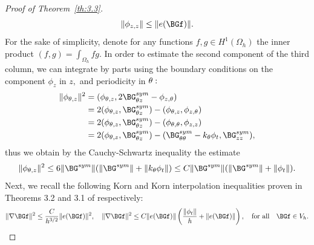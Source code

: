 \begin{proof}[Proof of Theorem~{\ref{th:3.3}}]
\begin{equation}
\label{4.14}
\|\phi_{z,z}\|\leq \|e(\BGf)\|.
\end{equation}%
For the sake of simplicity, denote for any functions $f,g\in H^1(\Omega_h)$ the inner product $(f,g)=\int_{\Omega_h}fg.$ In order to estimate the second component of the third column, we can integrate by parts using the boundary conditions on the component $\phi_z$ in $z,$ and periodicity in $\theta:$
\begin{align*}
\|\phi_{\Gth,z}\|^2&=(\phi_{\Gth,z},2\BG^{sym}_{\Gth z}-\phi_{z,\Gth})\\ 
&=2(\phi_{\Gth,z},\BG^{sym}_{\Gth z})-(\phi_{\Gth,z},\phi_{z,\Gth})\\
&=2(\phi_{\Gth,z},\BG^{sym}_{\Gth z})-(\phi_{\Gth,\Gth},\phi_{z,z})\\
&=2(\phi_{\Gth,z},\BG^{sym}_{\Gth z})-(\BG^{sym}_{\Gth\Gth}-k_\Gth \phi_{t},\BG^{sym}_{zz}),
\end{align*}
thus we obtain by the Cauchy-Schwartz inequality the estimate 
\begin{equation}
\label{4.15}
\|\phi_{\Gth,z}\|^2\leq 6\|\BG^{sym}\|(\|\BG^{sym}\|+\|k_\Gth\phi_t\|)\leq C\|\BG^{sym}\|(\|\BG^{sym}\|+\|\phi_t\|).
\end{equation}
Next, we recall the following Korn and Korn interpolation inequalities proven in Theorems  3.2 and 3.1 of \cite{bib:Gra.Har.4} respectively:
\begin{equation}
\label{4.16}
\|\nabla \BGf\|^{2} \leq \frac{C}{h^{3/2}}\|e(\BGf)\|^2,\quad \|\nabla \BGf\|^{2} \leq C\|e(\BGf)\|\left(\frac{\left\|\phi_{t}\right\|}{h}+\|e(\BGf)\|\right),
\quad\text{for all}\quad \BGf\in V_h.
\end{equation}


\end{proof}
